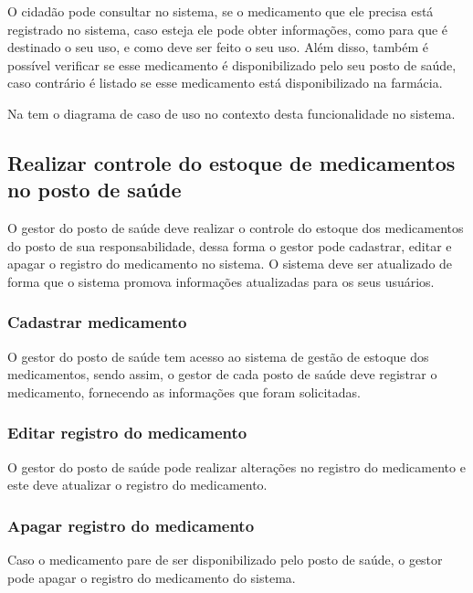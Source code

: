 O cidadão pode consultar no sistema, se o medicamento que ele precisa está registrado no sistema, caso esteja ele pode obter informações, como para que é destinado o seu uso, e como deve ser feito o seu uso. Além disso, também é possível verificar se esse medicamento é disponibilizado pelo seu posto de saúde, caso contrário é listado se esse medicamento está disponibilizado na farmácia.

Na  tem o diagrama de caso de uso no contexto desta funcionalidade no sistema.


%


\subsection{Realizar controle do estoque de medicamentos no posto de saúde}

O gestor do posto de saúde deve realizar o controle do estoque dos medicamentos do posto de sua responsabilidade, dessa forma o gestor pode cadastrar, editar e apagar o registro do medicamento no sistema. O sistema deve ser atualizado de forma que o sistema promova informações atualizadas para os seus usuários.

\subsubsection{Cadastrar medicamento}

O gestor do posto de saúde tem acesso ao sistema de gestão de estoque dos medicamentos, sendo assim, o gestor de cada posto de saúde deve registrar o medicamento, fornecendo as informações que foram solicitadas. 

\subsubsection{Editar registro do medicamento}
O gestor do posto de saúde pode realizar alterações no registro do medicamento e este deve atualizar o registro do medicamento.

\subsubsection{Apagar registro do medicamento}
Caso o medicamento pare de ser disponibilizado pelo posto de saúde, o gestor pode apagar o registro do medicamento do sistema.

